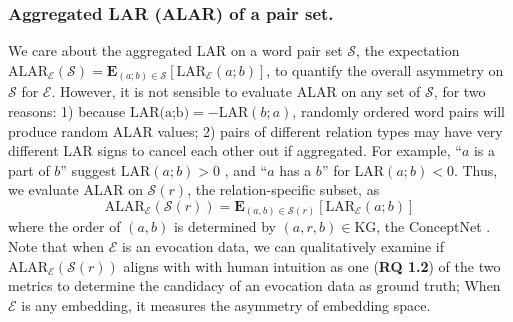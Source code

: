\documentclass[letterpaper]{article} %
\begin{document}
\subsubsection{Aggregated LAR (ALAR) of a pair set.}
We care about the aggregated LAR on a word pair set $\mathcal{S}$, the expectation
$    \mbox{ALAR}_\mathcal{E}(\mathcal{S}) = \mathbf{E}_{(a;b)\in \mathcal{S}} [\mbox{LAR}_\mathcal{E}(a;b)]
$, to quantify the overall asymmetry on $\mathcal{S}$ for $\mathcal{E}$. However, it is not sensible to evaluate ALAR on any set of $\mathcal{S}$, for two reasons:  1) because $\text{LAR(a;b)} = - \text{LAR}(b;a)$, randomly ordered word pairs will produce random ALAR values; 2) pairs of different relation types may have very different LAR signs to cancel each other out if aggregated. For example, ``$a$ is a part of $b$'' suggest LAR$(a;b)>0$ 
, and ``$a$ has a $b$'' for LAR$(a;b)< 0$. Thus, we evaluate ALAR on $\mathcal{S}(r)$, the relation-specific subset, as 
\begin{equation}
    \label{eq:alar}
    \mbox{ALAR}_\mathcal{E}(\mathcal{S}(r)) = \mathbf{E}_{(a,b)\in { \mathcal{S}(r)} } [\mbox{LAR}_\mathcal{E}(a;b)]
\end{equation}
where the order of $(a,b)$ is determined by $(a,r,b)\in \mbox{KG}$, the ConceptNet \cite{speer2017conceptnet}. Note that when $\mathcal{E}$ is an evocation data, we can qualitatively examine if $\mbox{ALAR}_\mathcal{E}(\mathcal{S}(r))$ aligns with with human intuition as one (\textbf{RQ 1.2}) of the two metrics to determine the candidacy of an evocation data as ground truth; When $\mathcal{E}$ is any embedding, it measures the asymmetry of embedding space.
\end{document}
